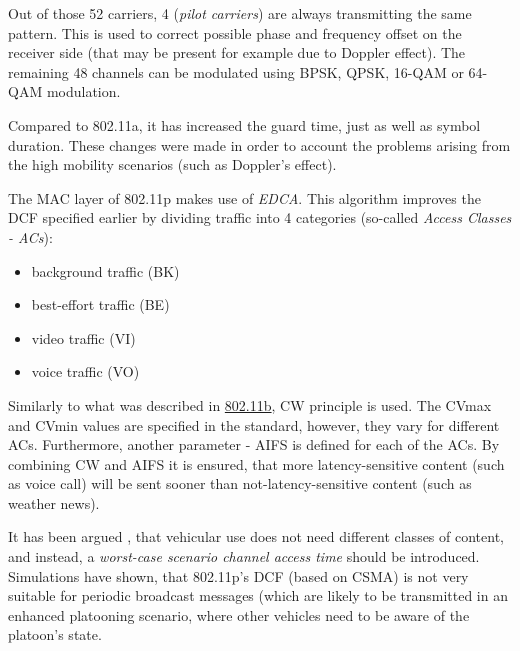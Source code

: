 Out of those 52 carriers, 4 (\emph{pilot carriers}) are always transmitting the same pattern. This is used to correct possible phase and frequency offset on the receiver side (that may be present for example due to Doppler effect\footnotemark). The remaining 48 channels can be modulated using \acrshort{BPSK}, \acrshort{QPSK}, 16-\acrshort{QAM} or 64-\acrshort{QAM} modulation.\par
% 
% 
Compared to 802.11a, it has increased the guard time, just as well as symbol duration. These changes were made in order to account the problems arising from the high mobility scenarios (such as Doppler's effect).\par
% 
% 
The \acrshort{MAC} layer of 802.11p makes use of \emph{\acrfull{EDCA}}. This algorithm improves the DCF specified earlier by dividing traffic into 4 categories (so-called \emph{Access Classes - \acrshort{AC}s}):
% 
\begin{itemize}[noitemsep]
    \item background traffic (BK)
    \item best-effort traffic (BE)
    \item video traffic (VI)
    \item voice traffic (VO)
\end{itemize}
% 
Similarly to what was described in \hyperref[sec:802.11b]{802.11b}, \acrshort{CW} principle is used. The CVmax and CVmin values are specified in the standard, however, they vary for different \acrshort{AC}s. Furthermore, another parameter - \acrfull{AIFS} is defined for each of the \acrshort{AC}s. By combining \acrshort{CW} and \acrshort{AIFS} it is ensured, that more latency-sensitive content (such as voice call) will be sent sooner than not-latency-sensitive content (such as weather news).\par
% 
It has been argued \cite{Bilstrup2008EvaluationCommunication}, that vehicular use does not need different classes of content, and instead, a \emph{worst-case scenario channel access time} should be introduced. Simulations have shown, that 802.11p's \acrshort{DCF} (based on CSMA) is not very suitable for periodic broadcast messages (which are likely to be transmitted in an enhanced platooning scenario, where other vehicles need to be aware of the platoon's state.
